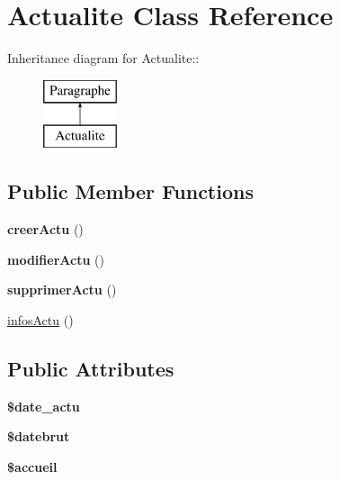 \hypertarget{class_actualite}{
\section{Actualite Class Reference}
\label{class_actualite}
}
Inheritance diagram for Actualite::\begin{figure}[H]
\begin{center}
\leavevmode
\includegraphics[height=2cm]{class_actualite}
\end{center}
\end{figure}
\subsection*{Public Member Functions}
\begin{DoxyCompactItemize}
\item 
\hypertarget{class_actualite_ad808999280b3d9bff7b1970abf172c31}{
{\bfseries creerActu} ()}
\label{class_actualite_ad808999280b3d9bff7b1970abf172c31}

\item 
\hypertarget{class_actualite_a395be213597980a30290c37535feb95e}{
{\bfseries modifierActu} ()}
\label{class_actualite_a395be213597980a30290c37535feb95e}

\item 
\hypertarget{class_actualite_a302913bb577b788ed556943e0118d783}{
{\bfseries supprimerActu} ()}
\label{class_actualite_a302913bb577b788ed556943e0118d783}

\item 
\hyperlink{class_actualite_ac2b51cc4f1589ec1a238b130741928ba}{infosActu} ()
\end{DoxyCompactItemize}
\subsection*{Public Attributes}
\begin{DoxyCompactItemize}
\item 
\hypertarget{class_actualite_a4b65d7d6122e3416bd94e9f559d2bd3f}{
{\bfseries \$date\_\-actu}}
\label{class_actualite_a4b65d7d6122e3416bd94e9f559d2bd3f}

\item 
\hypertarget{class_actualite_a6fca37e42a9afbd9550ee2d6bc87f9c0}{
{\bfseries \$datebrut}}
\label{class_actualite_a6fca37e42a9afbd9550ee2d6bc87f9c0}

\item 
\hypertarget{class_actualite_aa5ae954e67fb2a1f429f17559490bcbb}{
{\bfseries \$accueil}}
\label{class_actualite_aa5ae954e67fb2a1f429f17559490bcbb}

\end{DoxyCompactItemize}


